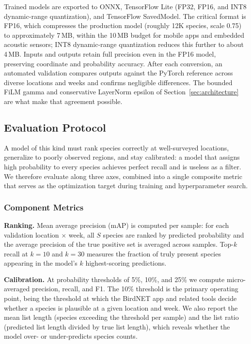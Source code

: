 Trained models are exported to ONNX, TensorFlow Lite (FP32, FP16, and INT8 dynamic-range quantization), and TensorFlow SavedModel. The critical format is FP16, which compresses the production model (roughly 12K species, scale 0.75) to approximately 7\,MB, within the 10\,MB budget for mobile apps and embedded acoustic sensors; INT8 dynamic-range quantization reduces this further to about 4\,MB. Inputs and outputs retain full precision even in the FP16 model, preserving coordinate and probability accuracy. After each conversion, an automated validation compares outputs against the PyTorch reference across diverse locations and weeks and confirms negligible differences. The bounded FiLM gamma and conservative LayerNorm epsilon of Section~\ref{sec:architecture} are what make that agreement possible.

\subsection{Evaluation Protocol}
\label{sec:evaluation}

A model of this kind must rank species correctly at well-surveyed locations, generalize to poorly observed regions, and stay calibrated: a model that assigns high probability to every species achieves perfect recall and is useless as a filter. We therefore evaluate along three axes, combined into a single composite metric that serves as the optimization target during training and hyperparameter search.

\subsubsection{Component Metrics}
\label{sec:metrics}

\textbf{Ranking.} Mean average precision (mAP) is computed per sample: for each validation location $\times$ week, all $S$ species are ranked by predicted probability and the average precision of the true positive set is averaged across samples. Top-$k$ recall at $k = 10$ and $k = 30$ measures the fraction of truly present species appearing in the model's $k$ highest-scoring predictions.

\textbf{Calibration.} At probability thresholds of 5\%, 10\%, and 25\% we compute micro-averaged precision, recall, and F1. The 10\% threshold is the primary operating point, being the threshold at which the BirdNET app and related tools decide whether a species is plausible at a given location and week. We also report the mean list length (species exceeding the threshold per sample) and the list ratio (predicted list length divided by true list length), which reveals whether the model over- or under-predicts species counts.

